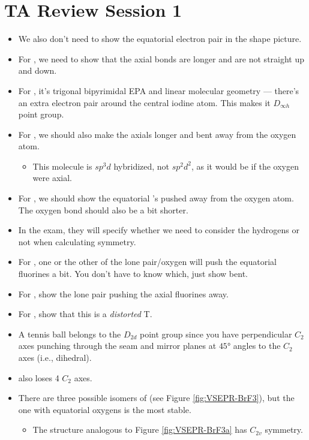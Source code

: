 \documentclass[../notes.tex]{subfiles}
\begin{document}
\section{TA Review Session 1}
\begin{itemize}
    \item {}We also don't need to show the equatorial electron pair in the shape picture.
    \item For , we need to show that the axial bonds are longer and are not straight up and down.
    \item For , it's trigonal bipyrimidal EPA and linear molecular geometry --- there's an extra electron pair around the central iodine atom. This makes it $D_{\infty h}$ point group.
    \item For , we should also make the axials longer and bent away from the oxygen atom.
    \begin{itemize}
        \item This molecule is $sp^3d$ hybridized, not $sp^2d^2$, as it would be if the oxygen were axial.
    \end{itemize}
    \item For , we should show the equatorial 's pushed away from the oxygen atom. The oxygen bond should also be a bit shorter.
    \item In the exam, they will specify whether we need to consider the hydrogens or not when calculating symmetry.
    \item For , one or the other of the lone pair/oxygen will push the equatorial fluorines a bit. You don't have to know which, just show bent.
    \item For , show the lone pair pushing the axial fluorines away.
    \item For , show that this is a \emph{distorted} T.
    \item A tennis ball belongs to the $D_{2d}$ point group since you have perpendicular $C_2$ axes punching through the seam and mirror planes at $\ang{45}$ angles to the $C_2$ axes (i.e., dihedral).
    \item {} also loses 4 $C_2$ axes.
    \item There are three possible isomers of  (see Figure \ref{fig:VSEPR-BrF3}), but the one with equatorial oxygens is the most stable.
    \begin{itemize}
        \item The structure analogous to Figure \ref{fig:VSEPR-BrF3a} has $C_{2v}$ symmetry.

\end{itemize}
\end{itemize}
\end{document}
